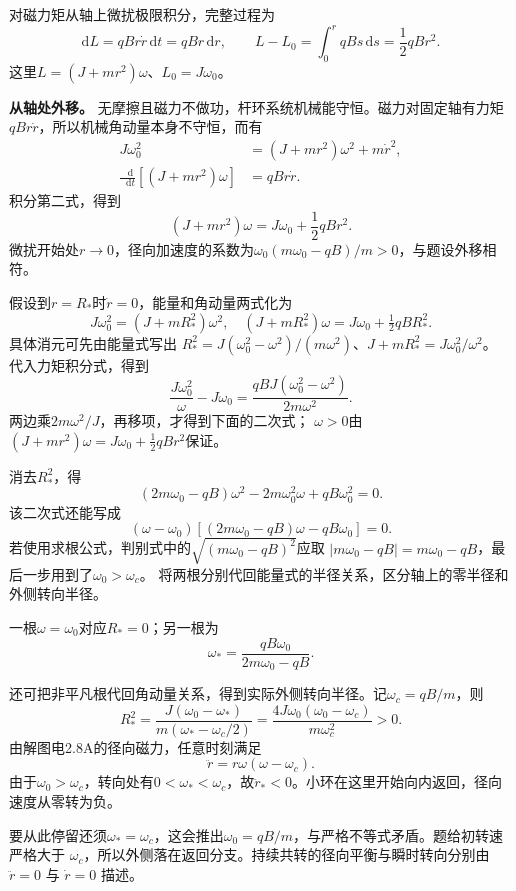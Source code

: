 \documentclass[UTF8,fontset=fandol,a4paper,11pt]{ctexart}
\newcommand{\dd}{\mathop{}\!\mathrm{d}}
\begin{document}
对磁力矩从轴上微扰极限积分，完整过程为
\[
\mathrm dL=qBr\dot r\,\mathrm dt=qBr\,\mathrm dr,\qquad
L-L_0=\int_0^r qBs\,\mathrm ds=\frac12qBr^2.
\]
这里$L=(J+mr^2)\omega$、$L_0=J\omega_0$。

\textbf{从轴处外移。} 无摩擦且磁力不做功，杆环系统机械能守恒。磁力对固定轴有力矩$qB r\dot r$，所以机械角动量本身不守恒，而有
\begin{align*}
 J\omega_0^2&=(J+mr^2)\omega^2+m\dot r^2,\\
 \frac{\dd}{\dd t}[(J+mr^2)\omega]&=qBr\dot r.
\end{align*}
积分第二式，得到
\[
 (J+mr^2)\omega=J\omega_0+\frac12qBr^2.
\]
微扰开始处$r\to0$，径向加速度的系数为$\omega_0(m\omega_0-qB)/m>0$，与题设外移相符。

假设到$r=R_*$时$\dot r=0$，能量和角动量两式化为
\[
 J\omega_0^2=(J+mR_*^2)\omega^2,\quad
 (J+mR_*^2)\omega=J\omega_0+\tfrac12qBR_*^2.
\]
具体消元可先由能量式写出
$R_*^2=J(\omega_0^2-\omega^2)/(m\omega^2)$、$J+mR_*^2=J\omega_0^2/\omega^2$。
代入力矩积分式，得到
\[
\frac{J\omega_0^2}{\omega}-J\omega_0
=\frac{qBJ(\omega_0^2-\omega^2)}{2m\omega^2}.
\]
两边乘$2m\omega^2/J$，再移项，才得到下面的二次式；
$\omega>0$由$(J+mr^2)\omega=J\omega_0+\tfrac12qBr^2$保证。

消去$R_*^2$，得
\[
 (2m\omega_0-qB)\omega^2-2m\omega_0^2\omega+qB\omega_0^2=0.
\]
该二次式还能写成
\[
(\omega-\omega_0)
[(2m\omega_0-qB)\omega-qB\omega_0]=0.
\]
若使用求根公式，判别式中的$\sqrt{(m\omega_0-qB)^2}$应取
$|m\omega_0-qB|=m\omega_0-qB$，最后一步用到了$\omega_0>\omega_c$。
将两根分别代回能量式的半径关系，区分轴上的零半径和外侧转向半径。

一根$\omega=\omega_0$对应$R_*=0$；另一根为
\[
 \omega_* =\frac{qB\omega_0}{2m\omega_0-qB}.
\]

还可把非平凡根代回角动量关系，得到实际外侧转向半径。记$\omega_c=qB/m$，则
\[
 R_*^2=\frac{J(\omega_0-\omega_*)}{m(\omega_*-\omega_c/2)}
 =\frac{4J\omega_0(\omega_0-\omega_c)}{m\omega_c^2}>0 .
\]
由解图电2.8A的径向磁力，任意时刻满足
\[
\ddot r=r\omega(\omega-\omega_c).
\]
由于$\omega_0>\omega_c$，转向处有$0<\omega_*<\omega_c$，故$\ddot r_*<0$。小环在这里开始向内返回，径向速度从零转为负。

要从此停留还须$\omega_*=\omega_c$，这会推出$\omega_0=qB/m$，与严格不等式矛盾。题给初转速严格大于 $\omega_c$，所以外侧落在返回分支。持续共转的径向平衡与瞬时转向分别由 $\ddot r=0$ 与 $\dot r=0$ 描述。
\end{document}
